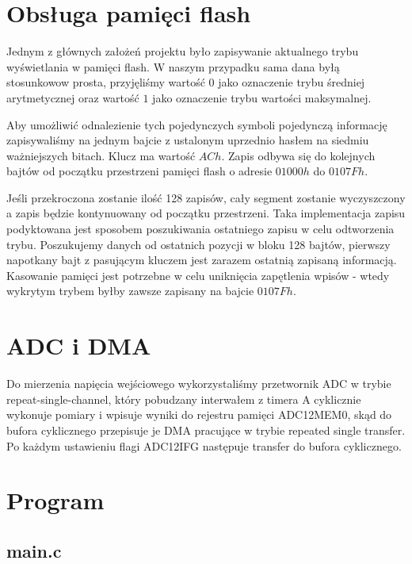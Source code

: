 \documentclass[fleqn]{article}
\begin{document}
\pagebreak
\section{Obsługa pamięci flash}
Jednym z głównych założeń projektu było zapisywanie aktualnego trybu wyświetlania w pamięci flash. W naszym przypadku sama dana byłą stosunkowow prosta, przyjęliśmy wartość $0$ jako oznaczenie trybu średniej arytmetycznej oraz wartość $1$ jako oznaczenie trybu wartości maksymalnej.

Aby umożliwić odnalezienie tych pojedynczych symboli pojedynczą informację zapisywaliśmy na jednym bajcie z ustalonym uprzednio hasłem na siedmiu ważniejszych bitach. Klucz ma wartość $ACh$. Zapis odbywa się do kolejnych bajtów od początku przestrzeni pamięci flash o adresie $01000h$ do $0107Fh$.

Jeśli przekroczona zostanie ilość 128 zapisów, cały segment zostanie wyczyszczony a zapis będzie kontynuowany od początku przestrzeni. Taka implementacja zapisu podyktowana jest sposobem poszukiwania ostatniego zapisu w celu odtworzenia trybu. Poszukujemy danych od ostatnich pozycji w bloku 128 bajtów, pierwszy napotkany bajt z pasującym kluczem jest zarazem ostatnią zapisaną informacją. Kasowanie pamięci jest potrzebne w celu uniknięcia zapętlenia wpisów - wtedy wykrytym trybem byłby zawsze zapisany na bajcie $0107Fh$.

\section{ADC i DMA}
Do mierzenia napięcia wejściowego wykorzystaliśmy przetwornik ADC w trybie repeat-single-channel, który pobudzany interwałem z timera A cyklicznie wykonuje pomiary i wpisuje wyniki do rejestru pamięci ADC12MEM0, skąd do bufora cyklicznego przepisuje je DMA pracujące w trybie repeated single transfer. Po każdym ustawieniu flagi ADC12IFG następuje transfer do bufora cyklicznego.



\section{Program}
\subsection{main.c}

\begin{minipage}[t]{.49\textwidth}
	
\end{minipage}\hfill
\noindent\begin{minipage}[t]{.49\textwidth}
	
\end{minipage}\hfill
\end{document}
